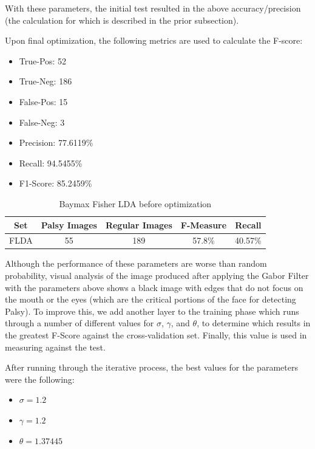 \documentclass[12pt, conference]{IEEEtran}
\begin{document}
With these parameters, the initial test resulted in the above accuracy/precision (the calculation for which is described in the prior subsection).

Upon final optimization, the following metrics are used to calculate the F-score:
\begin{itemize}
	\item True-Pos: 52
	\item True-Neg: 186
	\item False-Pos: 15
	\item False-Neg: 3
	\item Precision: 77.6119\%
	\item Recall: 94.5455\%
	\item F1-Score: 85.2459\%
\end{itemize}



\begin{table}
\begin{center}
\caption{Baymax Fisher LDA before optimization} %
\centering %
\begin{tabular}{c c c c c } %
\hline\hline %
Set & Palsy Images & Regular Images & F-Measure & Recall \\ [0.5ex]
\hline %
FLDA & 55 & 189 & 57.8\% & 40.57\% \\ %
[1ex] %
\hline %
\end{tabular}
\label{table:metrics} %
\end{center}	
\end{table}

Although the performance of these parameters are worse than random probability, visual analysis of the image produced after applying the Gabor Filter with the parameters above shows a black image with edges that do not focus on the mouth or the eyes (which are the critical portions of the face for detecting Palsy). To improve this, we add another layer to the training phase which runs through a number of different values for $\sigma$, $\gamma$, and $\theta$, to determine which results in the greatest F-Score against the cross-validation set. Finally, this value is used in measuring against the test.


After running through the iterative process, the best values for the parameters were the following:
\begin{itemize}
	\item $\sigma=1.2$
	\item $\gamma=1.2$
	\item $\theta=1.37445$
\end{itemize}
\end{document}
